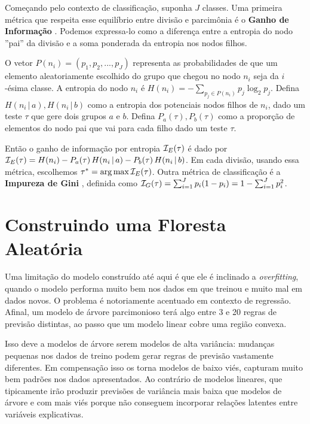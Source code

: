 Começando pelo contexto de classificação, suponha $J$ classes. Uma primeira métrica que respeita esse equilíbrio entre divisão e parcimônia é o \textbf{Ganho de Informação} \cite{kullback1951information}. Podemos expressa-lo como a diferença entre a entropia do nodo ''pai'' da divisão e a soma ponderada da entropia nos nodos filhos. 

O vetor $P(n_i) = (p_1, p_2, ..., p_J)$ representa as probabilidades de que um elemento aleatoriamente escolhido do grupo que chegou no nodo $n_i$ seja da $i$-ésima classe. A entropia do nodo $n_i$ é $H(n_i) = - \sum_{p_j \in P(n_i)} p_j \log_2 p_j$. Defina $H(n_i \, | \, a), H(n_i \, |\,  b)$ como a entropia dos potenciais nodos filhos de $n_i$, dado um teste $\tau$ que gere dois grupos $a$ e $b$. Defina $P_a(\tau), P_b(\tau)$ como a proporção de elementos do nodo pai que vai para cada filho dado um teste $\tau$. 

Então o ganho de informação por entropia $\mathcal{I}_E(\tau)$ é dado por $\mathcal{I}_E(\tau) = H(n_i) - P_a(\tau) \,H(n_i \, |\,  a) - P_b(\tau)\, H(n_i \, |\,  b)$. Em cada divisão, usando essa métrica, escolhemos $\tau^* = \operatorname*{arg\,max}{\mathcal{I}_E(\tau)}$.  Outra métrica de classificação é a \textbf{Impureza de Gini} \cite{strobl2009introduction}, definida como $\mathcal{I}_G(\tau) = \sum_{i = 1}^J p_i ( 1  - p_i) =  1 - \sum_{i = 1}^J p_i^2$.





 \section{Construindo uma Floresta Aleatória}
 

Uma limitação do modelo construído até aqui é que ele é inclinado a \textit{overfitting}, quando o modelo performa muito bem nos dados em que treinou e muito mal em dados novos. O problema é notoriamente acentuado em contexto de regressão. Afinal, um modelo de árvore parcimonioso terá algo entre 3 e 20 regras de previsão distintas, ao passo que um modelo linear cobre uma região convexa. 

Isso deve a modelos de árvore serem modelos de alta variância: mudanças pequenas nos dados de treino podem gerar regras de previsão vastamente diferentes. Em compensação isso os torna modelos de baixo viés, capturam muito bem padrões nos dados apresentados. Ao contrário de modelos lineares, que tipicamente irão produzir previsões de variância mais baixa que modelos de árvore e com mais viés porque não conseguem incorporar relações latentes entre variáveis explicativas. 

